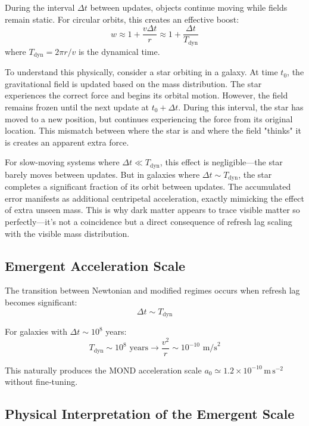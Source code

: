 \documentclass[twocolumn,prd,amsmath,amssymb,aps,superscriptaddress,nofootinbib]{revtex4-2}
\begin{document}
During the interval $\Delta t$ between updates, objects continue moving while fields remain static. For circular orbits, this creates an effective boost:
\begin{equation}
w \approx 1 + \frac{v \Delta t}{r} \approx 1 + \frac{\Delta t}{T_{\text{dyn}}}
\end{equation}
where $T_{\text{dyn}} = 2\pi r/v$ is the dynamical time.

To understand this physically, consider a star orbiting in a galaxy. At time $t_0$, the gravitational field is updated based on the mass distribution. The star experiences the correct force and begins its orbital motion. However, the field remains frozen until the next update at $t_0 + \Delta t$. During this interval, the star has moved to a new position, but continues experiencing the force from its original location. This mismatch between where the star is and where the field "thinks" it is creates an apparent extra force.

For slow-moving systems where $\Delta t \ll T_{\text{dyn}}$, this effect is negligible---the star barely moves between updates. But in galaxies where $\Delta t \sim T_{\text{dyn}}$, the star completes a significant fraction of its orbit between updates. The accumulated error manifests as additional centripetal acceleration, exactly mimicking the effect of extra unseen mass. This is why dark matter appears to trace visible matter so perfectly---it's not a coincidence but a direct consequence of refresh lag scaling with the visible mass distribution.

\subsection{Emergent Acceleration Scale}

The transition between Newtonian and modified regimes occurs when refresh lag becomes significant:
\begin{equation}
\Delta t \sim T_{\text{dyn}}
\end{equation}

For galaxies with $\Delta t \sim 10^8$ years:
\begin{equation}
T_{\text{dyn}} \sim 10^8 \text{ years} \rightarrow \frac{v^2}{r} \sim 10^{-10} \text{ m/s}^2
\end{equation}

This naturally produces the MOND acceleration scale $a_0 \simeq 1.2\times10^{-10}\,\mathrm{m\,s^{-2}}$ without fine‑tuning.

\subsection{Physical Interpretation of the Emergent Scale}
\end{document}
